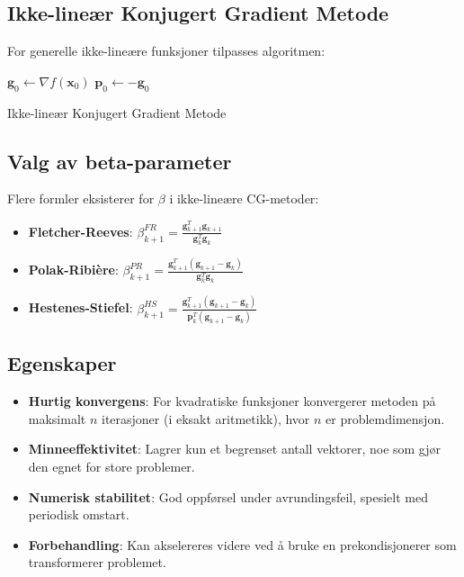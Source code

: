 \subsection{Ikke-lineær Konjugert Gradient Metode}
For generelle ikke-lineære funksjoner tilpasses algoritmen:

\begin{algorithm}[H]
  \SetAlgoLined
  \(\symbf{g}_0 \gets \nabla f(\symbf{x}_0)\) 
  \(\symbf{p}_0 \gets -\symbf{g}_0\) 
  \caption{Ikke-lineær Konjugert Gradient Metode}
\end{algorithm}

\subsection{Valg av beta-parameter}

Flere formler eksisterer for \(\beta\) i ikke-lineære CG-metoder:
\begin{itemize}
  \item \textbf{Fletcher-Reeves}: \(\beta_{k+1}^{FR} = \frac{\symbf{g}_{k+1}^T\symbf{g}_{k+1}}{\symbf{g}_k^T\symbf{g}_k}\)
  \item \textbf{Polak-Ribière}: \(\beta_{k+1}^{PR} = \frac{\symbf{g}_{k+1}^T(\symbf{g}_{k+1}-\symbf{g}_k)}{\symbf{g}_k^T\symbf{g}_k}\)
  \item \textbf{Hestenes-Stiefel}: \(\beta_{k+1}^{HS} = \frac{\symbf{g}_{k+1}^T(\symbf{g}_{k+1}-\symbf{g}_k)}{\symbf{p}_k^T(\symbf{g}_{k+1}-\symbf{g}_k)}\)
\end{itemize}

\subsection{Egenskaper}
\begin{itemize}
  \item \textbf{Hurtig konvergens}: For kvadratiske funksjoner konvergerer metoden på maksimalt \(n\) iterasjoner (i eksakt aritmetikk), hvor \(n\) er problemdimensjon.
  \item \textbf{Minneeffektivitet}: Lagrer kun et begrenset antall vektorer, noe som gjør den egnet for store problemer.
  \item \textbf{Numerisk stabilitet}: God oppførsel under avrundingsfeil, spesielt med periodisk omstart.
  \item \textbf{Forbehandling}: Kan akselereres videre ved å bruke en prekondisjonerer som transformerer problemet.
\end{itemize}

